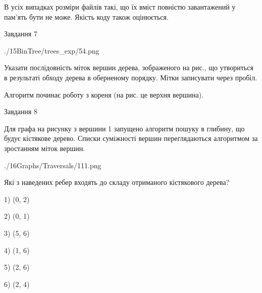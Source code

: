 \documentclass[12pt, ukrainian]{article}
\begin{document}
{В усіх випадках розміри файлів такі, що їх вміст повністю завантажений у пам'ять бути не може. Якість коду також оцінюється.



\vspace{10mm}\par

\newpage
\begin{minipage}[t]{9.7cm}
               
{\begin{center}Завдання {7}\end{center}}
\vspace{-6mm}

\begin{center}
	{./15BinTree/trees_exp/54.png}
\end{center}
Указати послідовність міток вершин дерева, зображеного на рис., що утвориться в результаті обходу дерева в оберненому порядку. Мітки записувати через пробіл.\par Алгоритм починає роботу з кореня (на рис. це верхня вершина).\par

\end{minipage}
\vline \hspace{8mm}
\begin{minipage}[t]{8.0cm}
               
{\begin{center}Завдання {8}\end{center}}
\vspace{-6mm}
Для графа на рисунку з вершини 1 запущено алгоритм пошуку в глибину, що будує кістякове дерево. Списки суміжності вершин переглядаються алгоритмом за зростанням міток вершин.\par
\begin{center}
	{./16Graphs/Traversals/111.png}
\end{center}
\par Які з наведених ребер входять до складу отриманого кістякового дерева?\par
1) (0, 2)\par
2) (0, 1)\par
3) (5, 6)\par
4) (1, 6)\par
5) (2, 6)\par
6) (2, 4)\par
{\vskip 15pt} \par


\end{minipage}}
\end{document}
